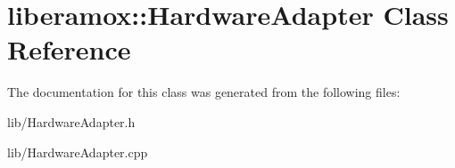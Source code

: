 \hypertarget{classliberamox_1_1HardwareAdapter}{}\section{liberamox\+:\+:Hardware\+Adapter Class Reference}
\label{classliberamox_1_1HardwareAdapter}


The documentation for this class was generated from the following files\+:\begin{DoxyCompactItemize}
\item 
lib/Hardware\+Adapter.\+h\item 
lib/Hardware\+Adapter.\+cpp\end{DoxyCompactItemize}
